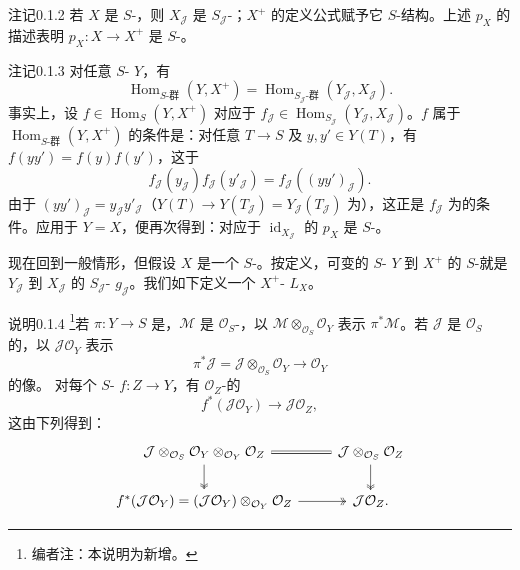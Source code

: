 \begin{SGAresult}{注记}{0.1.2}
若 $X$ 是 $S$-，则 $X_{\mathcal J}$ 是 $S_{\mathcal J}$-；$X^+$ 的定义公式赋予它 $S$-结构。上述 $p_X$ 的描述表明 $p_X:X\to X^+$ 是 $S$-。
\end{SGAresult}
\begin{SGAresult}{注记}{0.1.3}
对任意 $S$- $Y$，有
\[\operatorname{Hom}_{S\text{-群}}(Y,X^+)=\operatorname{Hom}_{S_{\mathcal J}\text{-群}}(Y_{\mathcal J},X_{\mathcal J}).\]
事实上，设 $f\in\operatorname{Hom}_S(Y,X^+)$ 对应于 $f_{\mathcal J}\in\operatorname{Hom}_{S_{\mathcal J}}(Y_{\mathcal J},X_{\mathcal J})$。$f$ 属于 $\operatorname{Hom}_{S\text{-群}}(Y,X^+)$ 的条件是：对任意 $T\to S$ 及 $y,y'\in Y(T)$，有 $f(yy')=f(y)f(y')$，这于
\[f_{\mathcal J}(y_{\mathcal J})f_{\mathcal J}(y'_{\mathcal J})=f_{\mathcal J}((yy')_{\mathcal J}).\]
由于 $(yy')_{\mathcal J}=y_{\mathcal J}y'_{\mathcal J}$（$Y(T)\to Y(T_{\mathcal J})=Y_{\mathcal J}(T_{\mathcal J})$ 为），这正是 $f_{\mathcal J}$ 为的条件。应用于 $Y=X$，便再次得到：对应于 $\operatorname{id}_{X_{\mathcal J}}$ 的 $p_X$ 是 $S$-。
\end{SGAresult}
现在回到一般情形，但假设 $X$ 是一个 $S$-。按定义，可变的 $S$- $Y$ 到 $X^+$ 的 $S$-就是 $Y_{\mathcal J}$ 到 $X_{\mathcal J}$ 的 $S_{\mathcal J}$- $g_{\mathcal J}$。我们如下定义一个 $X^+$- $L_X$。
\begin{SGAresult}{说明}{0.1.4}
\footnote{编者注：本说明为新增。}若 $\pi:Y\to S$ 是，$\mathcal M$ 是 $\mathcal O_S$-，以 $\mathcal M\otimes_{\mathcal O_S}\mathcal O_Y$ 表示 $\pi^*\mathcal M$。若 $\mathcal J$ 是 $\mathcal O_S$ 的，以 $\mathcal J\mathcal O_Y$ 表示
\[\pi^*\mathcal J=\mathcal J\otimes_{\mathcal O_S}\mathcal O_Y\longrightarrow\mathcal O_Y\]
的像。
对每个 $S$- $f:Z\to Y$，有 $\mathcal O_Z$-的
\[f^*(\mathcal J\mathcal O_Y)\longrightarrow\mathcal J\mathcal O_Z,\tag{0.1.4}\]
这由下列得到：
\[\begin{tikzcd}
\mathcal J\otimes_{\mathcal O_S}\mathcal O_Y\otimes_{\mathcal O_Y}\mathcal O_Z \arrow[r,equal]\arrow[d,two heads]&\mathcal J\otimes_{\mathcal O_S}\mathcal O_Z\arrow[d,two heads]\\
f^*(\mathcal J\mathcal O_Y)=(\mathcal J\mathcal O_Y)\otimes_{\mathcal O_Y}\mathcal O_Z\arrow[r,two heads]&\mathcal J\mathcal O_Z.
\end{tikzcd}\]
\end{SGAresult}
